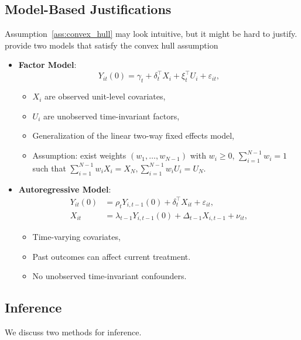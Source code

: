 \documentclass[11pt]{exam}
\begin{document}
\subsection{Model-Based Justifications}
Assumption~\ref{ass:convex_hull} may look intuitive, but it might be hard to justify. \citet{abadie2010synthetic} provide two models that satisfy the convex hull assumption
\begin{itemize}
    \item \textbf{Factor Model}: 
    \[
        Y_{it}(0) = \gamma_t + \delta_t^\top X_i + \xi_t^\top U_i + \varepsilon_{it},
    \]
    \begin{itemize}
        \item $X_i$ are observed unit-level covariates,
        \item $U_i$ are unobserved time-invariant factors,
        \item Generalization of the linear two-way fixed effects model,
        \item Assumption: exist weights $(w_1,\dots,w_{N-1})$ with $w_i \ge 0$, $\sum_{i=1}^{N-1} w_i = 1$ such that $\sum_{i=1}^{N-1} w_i X_i = X_N, 
  \sum_{i=1}^{N-1} w_i U_i = U_N$.
    \end{itemize}
    \item \textbf{Autoregressive Model}:
    \begin{align*}
            Y_{it}(0) &= \rho_t Y_{i,t-1}(0) + \delta_t^\top X_{it} + \varepsilon_{it}, \\
            X_{it}    &= \lambda_{t-1} Y_{i,t-1}(0) + \Delta_{t-1} X_{i,t-1} + \nu_{it},
    \end{align*}
    \begin{itemize}
        \item Time-varying covariates,
        \item Past outcomes can affect current treatment.
        \item No unobserved time-invariant confounders.
    \end{itemize}
\end{itemize}

\subsection{Inference}

We discuss two methods for inference.
\end{document}

